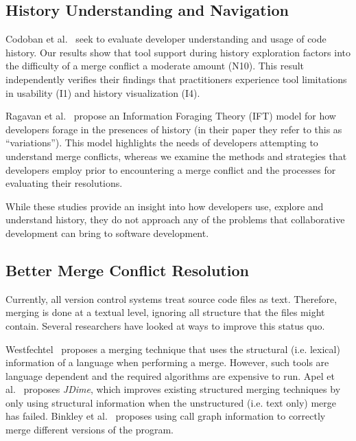 \subsection{History Understanding and Navigation}

Codoban et al.~\cite{Mihai_lenses} seek to evaluate developer understanding and usage of code history. 
Our results show that tool support during history exploration factors into the difficulty of a merge conflict a moderate amount (N10). 
This result independently verifies their findings that practitioners experience tool limitations in usability (I1) and history visualization (I4).

Ragavan et al.~\cite{ragavan_pfis-v_2017} propose an Information Foraging Theory (IFT) model for how developers forage in the presences of history (in their paper they refer to this as ``variations'').
This model highlights the needs of developers attempting to understand merge conflicts, whereas we examine the methods and strategies that developers employ prior to encountering a merge conflict and the processes for evaluating their resolutions.

While these studies provide an insight into how developers use, explore and understand history, they do not approach any of the problems that collaborative development can bring to software development.


\subsection{Better Merge Conflict Resolution}

Currently, all version control systems treat source code files as text.
Therefore, merging is done at a textual level, ignoring all structure that the files might contain.
Several researchers have looked at ways to improve this status quo.

Westfechtel~\cite{westfechtel_structure-oriented_1991} proposes a merging technique that uses the structural (i.e. lexical) information of a language when performing a merge. However, such tools are language dependent and the required algorithms are expensive to run.
Apel et al.~\cite{apel_structured_2012-1, apel_semistructured_2011} proposes \emph{JDime}, which improves existing structured merging techniques by only using structural information when the unstructured (i.e. text only) merge has failed.
Binkley et al.~\cite{binkley_program_1995} proposes using call graph information to correctly merge different versions of the program.

